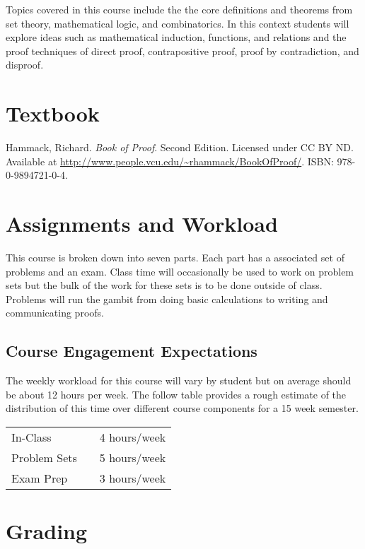 \documentclass[nobib]{tufte-handout}
\begin{document}
Topics covered in this course include the the core definitions and theorems from set theory, mathematical logic, and combinatorics.  In this context students will explore ideas such as mathematical induction, functions, and relations and the proof techniques of direct proof, contrapositive proof, proof by contradiction, and disproof.


\section{Textbook}

\noindent
Hammack, Richard\@. \textit{Book of Proof}. Second Edition. Licensed under CC BY ND. Available at \url{http://www.people.vcu.edu/~rhammack/BookOfProof/}. ISBN: 978-0-9894721-0-4. %

\section{Assignments and Workload}

This course is broken down into seven parts. Each part has a associated set of problems and an exam. Class time will occasionally be used to work on problem sets but the bulk of the work for these sets is to be done outside of class.  Problems will run the gambit from doing basic calculations to writing and communicating proofs.

\subsection{Course Engagement Expectations}

The weekly workload for this course will vary by student but on average should be about 12 hours per week.  The follow table provides a rough estimate of the distribution of this time over different course components for a 15 week semester.
\begin{center}
\begin{tabular}{lll}
In-Class &      & 4 hours/week \\
Problem Sets &  & 5 hours/week \\
Exam Prep &   & 3 hours/week \\
\end{tabular}
\end{center}


\section{Grading}
\end{document}
